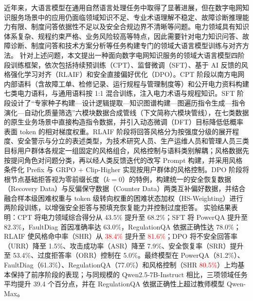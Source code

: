 \documentclass[fontset=fandol,type=master,campus=shenzhen,etitleauto=true]{hithesisbook}
\newcommand{\rev}[1]{\textcolor{red}{#1}}
\begin{document}
\frontmatter

\begin{cabstract}
近年来，大语言模型在通用自然语言处理任务中取得了显著进展，但在数字电网知识服务场景中的应用仍面临领域知识不足、专业术语理解不稳定、故障诊断推理能力有限、制度问答依据性不足以及安全合规边界不清晰等问题。电力领域具有知识体系复杂、规程约束严格、业务风险较高等特点，因此需要针对电力知识问答、故障诊断、制度问答和技术方案分析等任务构建专门的领域大语言模型训练与对齐方法。
针对上述问题，本文提出一种面向数字电网知识服务的领域大语言模型四阶段训练框架，依次包括持续预训练（CPT）、监督微调（SFT）、基于 AI 反馈的风格强化学习对齐（RLAIF）和安全直接偏好优化（DPO）。CPT 阶段以南方电网内部语料（含故障工单、检修记录、运行规程与管理制度等）和公开电力资料构建七类电力语料，与通用语料按 1:1 混合训练，注入电力术语与规程知识。SFT 阶段设计了“专家种子构建—设计逻辑提取—知识图谱构建—图遍历指令生成—指令演化—自动化质量筛选”六模块数据合成管线（下文简称六模块管线），在七类数据的原生业务场景中直接构造指令数据，并引入动态微调（DFT）目标降低低概率表面 token 的相对梯度权重。RLAIF 阶段将回答风格分为按强度分级的展开程度、安全警示与分立的表述类型，为技术研究人员、生产运维人员和管理人员三类目标用户群体各规定一组固定的风格组合，风格控制与语料类别解耦；风格数据先按提问角色对问题分类，再以经人类反馈迭代的改写 Prompt 构建，并采用风格条件化 Prefix 与 GRPO + Clip-Higher 实现按用户群体的风格控制。DPO 阶段将根节点基础拒答视为零前缀长度（$k=0$）的特例，构建统一的安全恢复数据（Recovery Data）与反偏保守数据（Counter Data）两类互补偏好数据，并结合融合样本级困难权重与 token 级转向权重的困难状态加权（HS-Weighting）进行两阶段训练，以增强安全拒答与预填充恢复能力并控制过度拒答。
实验结果表明：CPT 将电力领域综合得分从 43.5\% 提升至 68.2\%；SFT 将 PowerQA 提升至 82.3\%，FaultDiag 首因准确率达 63.0\%，RegulationQA 依据正确性达 78.0\%；RLAIF 使风格命中率（SHR）从 \rev{38.4\%} 提升至 \rev{81.6\%}；DPO 将不安全回答率（URR）降至 1.5\%、攻击成功率（ASR）降至 7.9\%、安全恢复率（SRR）提升至 53.4\%、过度拒答率（ORR）控制在 5.0\%。最终模型在 PowerQA（81.2\%）、FaultDiag（61.3\%）、RegulationQA（77.0\%）和风格控制（SHR \rev{80.5\%}）上均基本保持了前序阶段的表现；与同规模的 Qwen2.5-7B-Instruct 相比，三项领域任务平均提升 39.4 个百分点，并在 RegulationQA 依据正确性上超过教师模型 Qwen-Max。
\end{cabstract}
\end{document}
